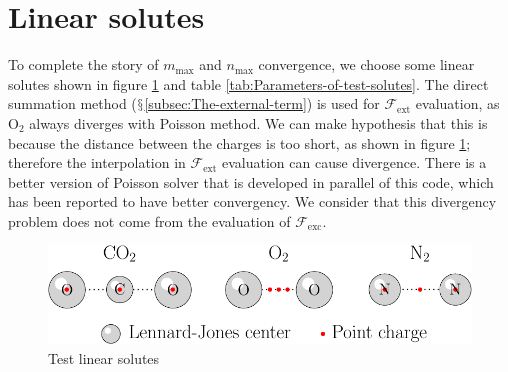 \section{Linear solutes}

To complete the story of $m_{\max}$ and $n_{\max}$ convergence,
we choose some linear solutes shown in figure \ref{fig:Test-linear-solutes}
and table \ref{tab:Parameters-of-test-solutes}. The direct summation
method ($\mathsection$\ref{subsec:The-external-term}) is used for
$\mathcal{F}_{\mathrm{ext}}$ evaluation, as $\mathrm{O}_{2}$ always
diverges with Poisson method. We can make hypothesis that this is
because the distance between the charges is too short, as shown in
figure \ref{fig:Test-linear-solutes}; therefore the interpolation
in $\mathcal{F}_{\mathrm{ext}}$ evaluation can cause divergence.
There is a better version of Poisson solver that is developed in parallel
of this code, which has been reported to have better convergency.
We consider that this divergency problem does not come from the evaluation
of $\mathcal{F}_{\mathrm{exc}}$.

\begin{figure}[h]
\begin{centering}
\includegraphics[scale=0.6]{_figure/app_solute}
\par\end{centering}
\caption{Test linear solutes\label{fig:Test-linear-solutes}}
\end{figure}

